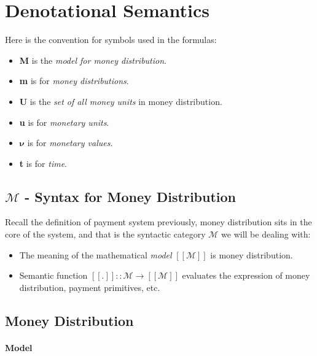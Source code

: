 \section{Denotational Semantics}

Here is the convention for symbols used in the formulas:

\begin{itemize}
\item \textbf{M} is the \textit{model for money distribution}.
\item \textbf{m} is for \textit{money distributions}.
\item \textbf{U} is the \textit{set of all money units} in money distribution.
\item \textbf{u} is for \textit{monetary units}.
\item $\boldsymbol{\nu}$ is for \textit{monetary values}.
\item \textbf{t} is for \textit{time}.
\end{itemize}

\subsection{$\mathcal{M}$ - Syntax for Money Distribution}

Recall the definition of payment system previously, money distribution sits in the core of the
system, and that is the syntactic category $\mathcal{M}$ we will be dealing with:

\begin{itemize}
    \item The meaning of the mathematical \textit{model} $[\![\mathcal{M}]\!]$ is money distribution.

    \item Semantic function $[\![.]\!] :: \mathcal{M} \rightarrow [\![\mathcal{M}]\!] $ evaluates
the expression of money distribution, payment primitives, etc.
\end{itemize}

\subsection{Money Distribution}

\paragraph{Model}

